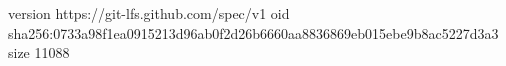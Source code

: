 version https://git-lfs.github.com/spec/v1
oid sha256:0733a98f1ea0915213d96ab0f2d26b6660aa8836869eb015ebe9b8ac5227d3a3
size 11088

